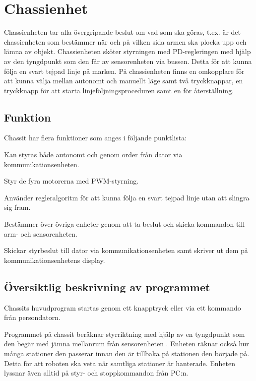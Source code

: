 \section{Chassienhet}
Chassienheten tar alla övergripande beslut om vad som ska göras, t.ex. är det chassienheten som bestämmer när och på vilken sida armen ska plocka upp och lämna av objekt. Chassienheten sköter styrningen med PD-regleringen med hjälp av den tyngdpunkt som den får av sensorenheten via bussen. Detta för att kunna följa en svart tejpad linje på marken. På chassienheten finns en omkopplare för att kunna välja mellan autonomt och manuellt läge samt två tryckknappar, en tryckknapp för att starta linjeföljningsproceduren samt en för återställning. 


\subsection{Funktion}

Chassit har flera funktioner som anges i följande punktlista:
\begin{packed_itemize}
\item Kan styras både autonomt och genom order från dator via kommunikationsenheten.
\item Styr de fyra motorerna med PWM-styrning.
\item Använder regleralgoritm för att kunna följa en svart tejpad linje utan att slingra sig fram.
\item Bestämmer över övriga enheter genom att ta beslut och skicka kommandon till arm- och sensorenheten.
\item Skickar styrbeslut till dator via kommunikationsenheten samt skriver ut dem på kommunikationsenhetens display.
\end{packed_itemize}

\subsection{Översiktlig beskrivning av programmet}

Chassits huvudprogram startas genom ett knapptryck eller via ett kommando från persondatorn. 

Programmet på chassit beräknar styrriktning med hjälp av en tyngdpunkt som den begär med jämna mellanrum från sensorenheten . Enheten räknar också hur många stationer den passerar innan den är tillbaka på stationen den började på. Detta för att roboten ska veta när samtliga stationer är hanterade. Enheten lyssnar även alltid på styr- och stoppkommandon från PC:n.

